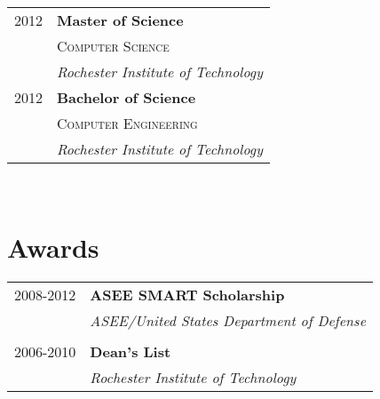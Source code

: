 \documentclass[10pt]{article} %
\begin{document}
{\begin{minipage}[t]{0.44\textwidth}
\begin{tabular}{rl}

2012 & \textbf{Master of Science} \\
& \textsc{Computer Science} \\ 
& \textit{Rochester Institute of Technology}\\
	 

2012 & \textbf{Bachelor of Science} \\ 
& \textsc{Computer Engineering} \\ 
& \textit{Rochester Institute of Technology}\\
	

\end{tabular}\\[10pt]


\section{Awards} 

\begin{tabular}{rl}
2008-2012	 & \textbf{ASEE SMART Scholarship}\\
& \textit{ASEE/United States Department of Defense}\\ \\


2006-2010	 & \textbf{Dean's List}\\
& \textit{Rochester Institute of Technology}
\end{tabular}\\[10pt]



\end{minipage}}
\end{document}
